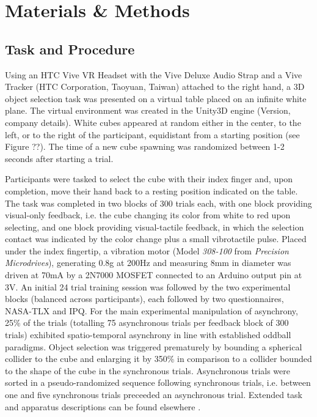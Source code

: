 \section{Materials \& Methods}
\subsection{Task and Procedure}
Using an HTC Vive VR Headset with the Vive Deluxe Audio Strap and a Vive Tracker (HTC Corporation, Taoyuan, Taiwan) attached to the right hand, a 3D object selection task was presented on a virtual table placed on an infinite white plane. The virtual environment was created in the Unity3D engine (Version, company details). White cubes appeared at random either in the center, to the left, or to the right of the participant, equidistant from a starting position (see Figure ??). The time of a new cube spawning was randomized between 1-2 seconds after starting a trial. 

Participants were tasked to select the cube with their index finger and, upon completion, move their hand back to a resting position indicated on the table. The task was completed in two blocks of 300 trials each, with one block providing visual-only feedback, i.e. the cube changing its color from white to red upon selecting, and one block providing visual-tactile feedback, in which the selection contact was indicated by the color change plus a small vibrotactile pulse. Placed under the index fingertip, a vibration motor (Model \textit{308-100} from \textit{Precision Microdrives}), generating 0.8g at 200Hz and measuring 8mm in diameter was driven at 70mA by a 2N7000 MOSFET connected to an Arduino output pin at 3V. An initial 24 trial training session was followed by the two experimental blocks (balanced across participants), each followed by two questionnaires, NASA-TLX and IPQ. For the main experimental manipulation of asynchrony, 25\% of the trials (totalling 75 asynchronous trials per feedback block of 300 trials) exhibited spatio-temporal asynchrony in line with established oddball paradigms. Object selection was triggered prematurely by bounding a spherical collider to the cube and enlarging it by 350\% in comparison to a collider bounded to the shape of the cube in the synchronous trials. Asynchronous trials were sorted in a pseudo-randomized sequence following synchronous trials, i.e. between one and five synchronous trials preceeded an asynchronous trial. Extended task and apparatus descriptions can be found elsewhere \cite{Gehrke2019}.

